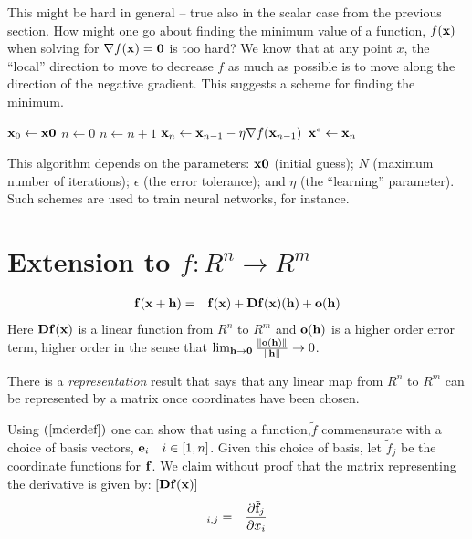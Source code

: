 \documentclass{article}
\begin{document}
This might be hard in general -- true also in the scalar case from the previous
section.
How might one go about finding the minimum value of a function, $f({\bf x})$
when solving for $\nabla f({\bf x}) = {\bf 0}$ is too hard?
We know that at any point $x$, the ``local''{} direction to move to decrease $f$
as much as possible is to move along the direction of the negative gradient.
This suggests a scheme for finding the minimum.
\begin{algorithmic}
  \STATE ${\bf x}_0 \leftarrow {\bf x0}$
  \STATE $n \leftarrow 0$
  \STATE $n \leftarrow n + 1$
  \STATE ${\bf x}_n \leftarrow {\bf x}_{n-1} - \eta \nabla f({\bf x}_{n-1})$
  \ENDWHILE
  \STATE ${\bf x}^* \leftarrow {\bf x}_n$
\end{algorithmic}
This algorithm depends on the parameters: ${\bf x0}$ (initial guess);
$N$ (maximum number of iterations);
$\epsilon$ (the error tolerance); and $\eta$ (the ``learning''{} parameter).
Such schemes are used to train neural networks, for instance.


\section{Extension to $f:R^n \rightarrow R^m$}
\begin{eqnarray}
  {\bf f}({\bf x} + {\bf h}) & = & {\bf f}({\bf x}) + {\bf Df}({\bf x})({\bf h})
  + {\bf o}({\bf h}) \label{mderdef}
\end{eqnarray}
Here ${\bf Df}({\bf x})$ is a linear function from $R^n$ to $R^m$ and
${\bf o}({\bf h})$ is a higher order error term, higher order in the sense that
$\lim_{{\bf h} \rightarrow {\bf 0}}\frac{\|{\bf o}({\bf h})\|}{\|{\bf h}\|} \rightarrow 0$.

There is a {\em representation\/} result that says that any linear map from $R^n$ to $R^m$ can
be represented by a matrix once coordinates have been chosen.

Using $(\ref{mderdef})$ one can show that using a function,${\tilde f}$
commensurate with a choice of basis vectors, ${\bf e}_i \quad i \in [1, n]$. Given
this choice of basis, let ${\tilde f}_j$ be the coordinate functions for ${\bf f}$.
We claim without proof that the matrix representing the derivative is given by:
$[{\bf Df}({\bf x})]$
\begin{eqnarray}
  [{\bf Df}(x)]_{i,j} & = & \frac{\partial {\tilde {\bf f}}_j}{\partial x_i}
\end{eqnarray}
\end{document}
